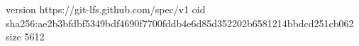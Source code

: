 version https://git-lfs.github.com/spec/v1
oid sha256:ae2b3bfdbf5349bdf4690f7700fddb4e6d85d352202b6581214bbdcd251cb062
size 5612
